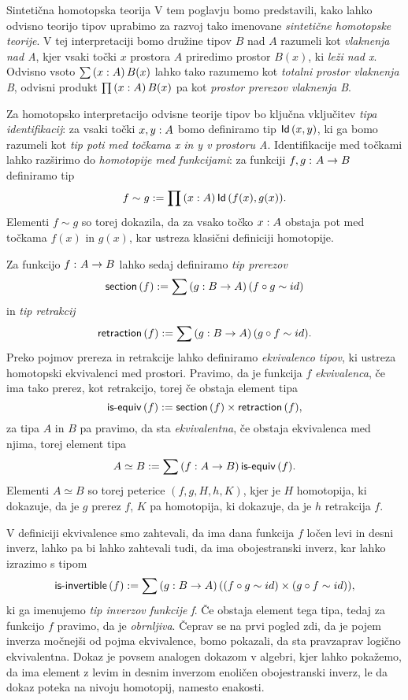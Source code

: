 \documentclass[a4paper, slovene]{article}
\begin{document}
\begin{section}{Sintetična homotopska teorija}
  V tem poglavju bomo predstavili, kako lahko odvisno teorijo tipov uprabimo za razvoj
  tako imenovane \emph{sintetične homotopske teorije}. V tej interpretaciji bomo družine
  tipov \(B\) nad \(A\) razumeli kot \emph{vlaknenja nad A}, kjer vsaki točki \(x\)
  prostora \(A\) priredimo prostor \(B(x)\), ki \emph{leži nad x}. Odvisno vsoto
  \(\sum \left( x : A \right) B(x)\) lahko tako razumemo kot \emph{totalni prostor vlaknenja B},
  odvisni produkt \(\prod \left( x : A \right) B(x)\) pa kot \emph{prostor prerezov vlaknenja B}.

  Za homotopsko interpretacijo
  odvisne teorije tipov bo ključna vključitev \emph{tipa identifikacij}: za vsaki točki
  \(x, y : A\) bomo definiramo tip \(\textnormal{\textsf{Id}}\,(x, y)\),
  ki ga bomo razumeli
  kot \emph{tip poti med točkama x in y v prostoru A}. Identifikacije med točkami
  lahko razširimo do \emph{homotopije med funkcijami}: za funkciji \(f, g \,\colon A \to B\)
  definiramo tip
  \[f \sim g := \prod \left( x : A \right) \textnormal{\textsf{Id}}\,(f(x), g(x)).\]
  Elementi \(f \sim g\) so torej dokazila, da za vsako točko \(x : A\) obstaja
  pot med točkama \(f(x)\) in \(g(x)\), kar ustreza klasični definiciji homotopije.

  Za funkcijo \(f \,\colon A \to B\) lahko sedaj definiramo \emph{tip prerezov}
  \[\textnormal{\textsf{section}}\,(f) := \sum \left( g : B \to A \right) (f \circ g \sim id)\] in \emph{tip retrakcij}
  \[\textnormal{\textsf{retraction}}\,(f) := \sum \left( g : B \to A \right) (g \circ f \sim id).\]
  Preko pojmov prereza in retrakcije lahko definiramo \emph{ekvivalenco tipov},
  ki ustreza homotopski ekvivalenci
  med prostori. Pravimo, da je funkcija \(f\) \emph{ekvivalenca}, če ima tako prerez, kot
  retrakcijo, torej če obstaja element tipa
  \[\textnormal{\textsf{is-equiv}}\,(f) := \textnormal{\textsf{section}}\,(f) \times \textnormal{\textsf{retraction}}\,(f),\] za tipa \(A\) in \(B\) pa pravimo, da sta
  \emph{ekvivalentna}, če obstaja ekvivalenca med njima, torej element tipa
  \[A \simeq B := \sum \left( f : A \to B \right) \textnormal{\textsf{is-equiv}}\,(f).\]
  Elementi \(A \simeq B\) so torej peterice \((f, g, H, h, K)\), kjer je \(H\) homotopija,
  ki dokazuje, da je \(g\) prerez \(f\), \(K\) pa homotopija, ki dokazuje, da je \(h\)
  retrakcija \(f\).

  V definiciji ekvivalence smo zahtevali, da ima dana funkcija \(f\)
  ločen levi in desni inverz, lahko pa bi lahko zahtevali tudi,
  da ima obojestranski inverz, kar lahko izrazimo s tipom
  \[\textnormal{\textsf{is-invertible}}\,(f) := \sum \left( g : B \to A \right) ((f \circ g \sim id) \times (g \circ f \sim id)),\]
  ki ga imenujemo \emph{tip inverzov funkcije f}. Če obstaja element tega tipa, tedaj
  za funkcijo \(f\)
  pravimo, da je \emph{obrnljiva}. Čeprav se na prvi pogled zdi,
  da je pojem inverza močnejši od pojma ekvivalence, bomo pokazali, da sta pravzaprav
  logično ekvivalentna. Dokaz je povsem analogen dokazom v algebri, kjer lahko pokažemo,
  da ima element z levim in desnim inverzom enoličen obojestranski inverz, le da dokaz
  poteka na nivoju homotopij, namesto enakosti.


\end{section}
\end{document}
